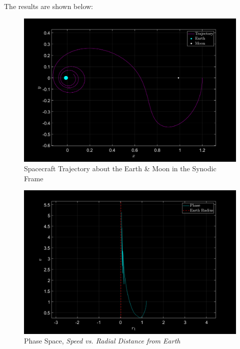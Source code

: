 \documentclass{article}
\begin{document}
\vspace{\baselineskip}

The results are shown below:

\begin{figure}[h]
    \centering
    \includegraphics[width=\textwidth]{fig/trajectory2.png}
    \caption{Spacecraft Trajectory about the Earth \& Moon in the Synodic Frame}
    \label{fig3}
\end{figure}

\pagebreak

\begin{figure}[!h]
    \centering
    \includegraphics[width=\textwidth]{fig/phase2.png}
    \caption{Phase Space, \textit{Speed vs. Radial Distance from Earth}}
    \label{fig4}
\end{figure}
\end{document}
